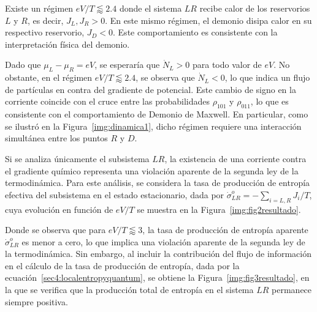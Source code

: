 Existe un régimen \( eV/T \lessapprox 2.4 \) donde el sistema \( LR \) recibe calor de los reservorios \( L \) y \( R \), es decir, \( J_L, J_R > 0 \). En este mismo régimen, el demonio disipa calor en su respectivo reservorio, \( J_D < 0 \). Este comportamiento es consistente con la interpretación física del demonio.

Dado que $\mu_L - \mu_R = eV$, se esperaría que $\dot{N}_L > 0$ para todo valor de $eV$. No obstante, en el régimen $eV/T \lessapprox 2.4$, se observa que $\dot{N}_L < 0$, lo que indica un flujo de partículas en contra del gradiente de potencial. Este cambio de signo en la corriente coincide con el cruce entre las probabilidades $\rho_{101}$ y $\rho_{011}$, lo que es consistente con el comportamiento de Demonio de Maxwell. En particular, como se ilustró en la Figura~\ref{img:dinamica1}, dicho régimen requiere una interacción simultánea entre los puntos $R$ y $D$.

Si se analiza únicamente el subsistema $LR$, la existencia de una corriente contra el gradiente químico representa una violación aparente de la segunda ley de la termodinámica. Para este análisis, se considera la tasa de producción de entropía efectiva del subsistema en el estado estacionario, dada por $\dot{\sigma}^{o}_{LR} = - \sum_{i=L,R} J_i/T$, cuya evolución en función de $eV/T$ se muestra en la Figura~\ref{img:fig2resultado}.




Donde se observa que para $eV/T \lessapprox 3$, la tasa de producción de entropía aparente $\dot{\sigma}^{o}_{LR}$ es menor a cero, lo que implica una violación aparente de la segunda ley de la termodinámica. Sin embargo, al incluir la contribución del flujo de información en el cálculo de la tasa de producción de entropía, dada por la ecuación~\eqref{sec4:localentropyquantum}, se obtiene la Figura~\ref{img:fig3resultado}, en la que se verifica que la producción total de entropía en el sistema $LR$ permanece siempre positiva.

